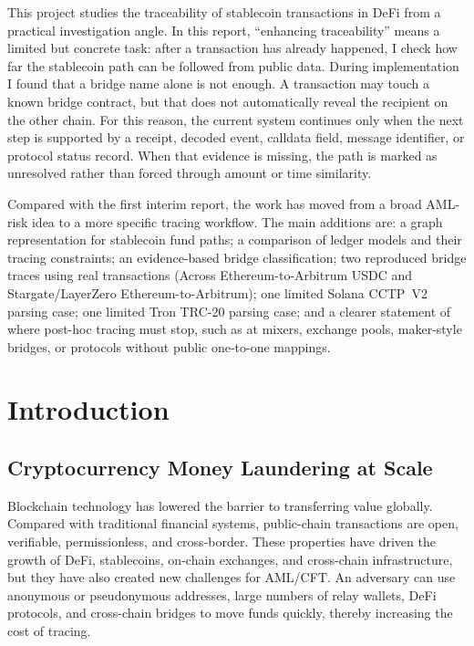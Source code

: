 \documentclass[12pt,a4paper]{article}
\begin{document}
This project studies the traceability of stablecoin transactions in DeFi from a practical investigation angle. In this report, ``enhancing traceability'' means a limited but concrete task: after a transaction has already happened, I check how far the stablecoin path can be followed from public data. During implementation I found that a bridge name alone is not enough. A transaction may touch a known bridge contract, but that does not automatically reveal the recipient on the other chain. For this reason, the current system continues only when the next step is supported by a receipt, decoded event, calldata field, message identifier, or protocol status record. When that evidence is missing, the path is marked as unresolved rather than forced through amount or time similarity.

Compared with the first interim report, the work has moved from a broad AML-risk idea to a more specific tracing workflow. The main additions are: a graph representation for stablecoin fund paths; a comparison of ledger models and their tracing constraints; an evidence-based bridge classification; two reproduced bridge traces using real transactions (Across Ethereum-to-Arbitrum USDC and Stargate/LayerZero Ethereum-to-Arbitrum); one limited Solana CCTP~V2 parsing case; one limited Tron TRC-20 parsing case; and a clearer statement of where post-hoc tracing must stop, such as at mixers, exchange pools, maker-style bridges, or protocols without public one-to-one mappings.

\section{Introduction}

\subsection{Cryptocurrency Money Laundering at Scale}

Blockchain technology has lowered the barrier to transferring value globally. Compared with traditional financial systems, public-chain transactions are open, verifiable, permissionless, and cross-border. These properties have driven the growth of DeFi, stablecoins, on-chain exchanges, and cross-chain infrastructure, but they have also created new challenges for AML/CFT. An adversary can use anonymous or pseudonymous addresses, large numbers of relay wallets, DeFi protocols, and cross-chain bridges to move funds quickly, thereby increasing the cost of tracing.
\end{document}
